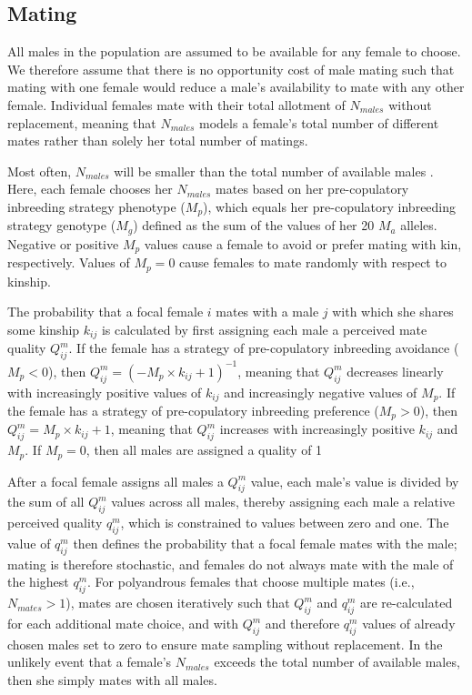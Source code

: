 \documentclass[10pt,letterpaper]{article}
\begin{document}
\subsection*{Mating}

All males in the population are assumed to be available for any female to choose. We therefore assume that there is no opportunity cost of male mating such that mating with one female would reduce a male's availability to mate with any other female. Individual females mate with their total allotment of $N_{males}$ without replacement, meaning that $N_{males}$ models a female's total number of different mates rather than solely her total number of matings.

Most often, $N_{males}$ will be smaller than the total number of available males \cite[][]{Duthie}. Here, each female chooses her $N_{males}$ mates based on her pre-copulatory inbreeding strategy phenotype ($M_{p}$), which equals her pre-copulatory inbreeding strategy genotype ($M_{g}$) defined as the sum of the values of her 20 $M_{a}$ alleles. Negative or positive $M_{p}$ values cause a female to avoid or prefer mating with kin, respectively. Values of $M_{p}=0$ cause females to mate randomly with respect to kinship.

The probability that a focal female $i$ mates with a male $j$ with which she shares some kinship $k_{ij}$ is calculated by first assigning each male a perceived mate quality $Q^{m}_{ij}$. If the female has a strategy of pre-copulatory inbreeding avoidance ($M_{p}<0$), then $Q^{m}_{ij} = (-M_{p} \times k_{ij} + 1)^{-1}$, meaning that $Q^{m}_{ij}$ decreases linearly with increasingly positive values of $k_{ij}$ and increasingly negative values of $M_{p}$. If the female has a strategy of pre-copulatory inbreeding preference ($M_{p}>0$), then $Q^{m}_{ij} = M_{p} \times k_{ij} + 1$, meaning that $Q^{m}_{ij}$ increases with increasingly positive $k_{ij}$ and $M_{p}$. If $M_{p}=0$, then all males are assigned a quality of 1

After a focal female assigns all males a $Q^{m}_{ij}$ value, each male's value is divided by the sum of all $Q^{m}_{ij}$ values across all males, thereby assigning each male a relative perceived quality $q^{m}_{ij}$, which is constrained to values between zero and one. The value of $q^{m}_{ij}$ then defines the probability that a focal female mates with the male; mating is therefore stochastic, and females do not always mate with the male of the highest $q^{m}_{ij}$. For polyandrous females that choose multiple mates (i.e., $N_{mates}>1$), mates are chosen iteratively such that $Q^{m}_{ij}$ and $q^{m}_{ij}$ are re-calculated for each additional mate choice, and with $Q^{m}_{ij}$ and therefore $q^{m}_{ij}$ values of already chosen males set to zero to ensure mate sampling without replacement. In the unlikely event that a female's $N_{males}$ exceeds the total number of available males, then she simply mates with all males.
\end{document}
